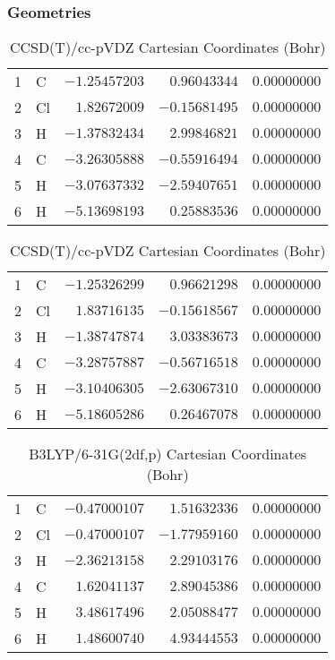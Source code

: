 \documentclass[10pt,oneside]{article}
\begin{document}
\begin{table}[h!]
\subsubsection*{Geometries}
\begin{multicols}{2}
\centering
\caption{CCSD(T)/cc-pVTZ Cartesian Coordinates (Bohr)}
\begin{tabular}{llrrr}
\toprule
1  & C  & $-1.25457203$ & $ 0.96043344$ & $ 0.00000000$ \\
2  & Cl & $ 1.82672009$ & $-0.15681495$ & $ 0.00000000$ \\
3  & H  & $-1.37832434$ & $ 2.99846821$ & $ 0.00000000$ \\
4  & C  & $-3.26305888$ & $-0.55916494$ & $ 0.00000000$ \\
5  & H  & $-3.07637332$ & $-2.59407651$ & $ 0.00000000$ \\
6  & H  & $-5.13698193$ & $ 0.25883536$ & $ 0.00000000$ \\
\bottomrule
\end{tabular}
\caption{CCSD(T)/cc-pVDZ Cartesian Coordinates (Bohr)}
\begin{tabular}{llrrr}
\toprule
1  & C  & $-1.25326299$ & $ 0.96621298$ & $ 0.00000000$ \\
2  & Cl & $ 1.83716135$ & $-0.15618567$ & $ 0.00000000$ \\
3  & H  & $-1.38747874$ & $ 3.03383673$ & $ 0.00000000$ \\
4  & C  & $-3.28757887$ & $-0.56716518$ & $ 0.00000000$ \\
5  & H  & $-3.10406305$ & $-2.63067310$ & $ 0.00000000$ \\
6  & H  & $-5.18605286$ & $ 0.26467078$ & $ 0.00000000$ \\
\bottomrule
\end{tabular}
\end{multicols}
\end{table}

\begin{table}[h]
\centering
\caption{B3LYP/6-31G(2df,p) Cartesian Coordinates (Bohr)}
\begin{tabular}{llrrr}
\toprule
1  & C  & $-0.47000107$ & $ 1.51632336$ & $ 0.00000000$ \\
2  & Cl & $-0.47000107$ & $-1.77959160$ & $ 0.00000000$ \\
3  & H  & $-2.36213158$ & $ 2.29103176$ & $ 0.00000000$ \\
4  & C  & $ 1.62041137$ & $ 2.89045386$ & $ 0.00000000$ \\
5  & H  & $ 3.48617496$ & $ 2.05088477$ & $ 0.00000000$ \\
6  & H  & $ 1.48600740$ & $ 4.93444553$ & $ 0.00000000$ \\
\bottomrule
\end{tabular}
\end{table}
\end{document}
